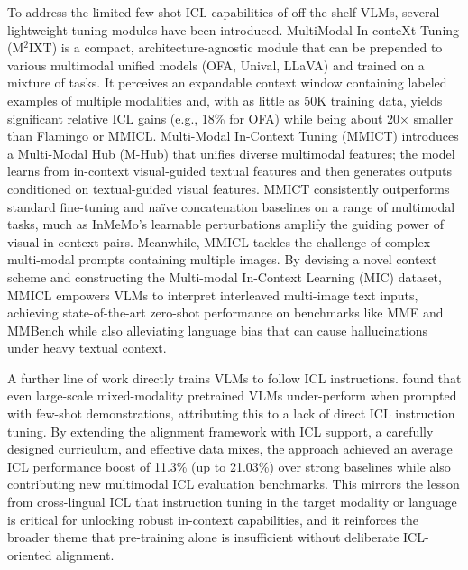 \documentclass[11pt]{article}
\begin{document}
To address the limited few-shot ICL capabilities of off-the-shelf VLMs, several lightweight tuning modules have been introduced. MultiModal In-conteXt Tuning (M\(^2\)IXT) \cite{ref107} is a compact, architecture-agnostic module that can be prepended to various multimodal unified models (OFA, Unival, LLaVA) and trained on a mixture of tasks. It perceives an expandable context window containing labeled examples of multiple modalities and, with as little as 50K training data, yields significant relative ICL gains (e.g., 18\% for OFA) while being about 20× smaller than Flamingo or MMICL. Multi-Modal In-Context Tuning (MMICT) \cite{ref108} introduces a Multi-Modal Hub (M-Hub) that unifies diverse multimodal features; the model learns from in-context visual-guided textual features and then generates outputs conditioned on textual-guided visual features. MMICT consistently outperforms standard fine-tuning and naïve concatenation baselines on a range of multimodal tasks, much as InMeMo's learnable perturbations amplify the guiding power of visual in-context pairs. Meanwhile, MMICL \cite{ref119} tackles the challenge of complex multi-modal prompts containing multiple images. By devising a novel context scheme and constructing the Multi-modal In-Context Learning (MIC) dataset, MMICL empowers VLMs to interpret interleaved multi-image text inputs, achieving state-of-the-art zero-shot performance on benchmarks like MME and MMBench while also alleviating language bias that can cause hallucinations under heavy textual context.

A further line of work directly trains VLMs to follow ICL instructions. \cite{ref120} found that even large-scale mixed-modality pretrained VLMs under-perform when prompted with few-shot demonstrations, attributing this to a lack of direct ICL instruction tuning. By extending the alignment framework with ICL support, a carefully designed curriculum, and effective data mixes, the approach achieved an average ICL performance boost of 11.3\% (up to 21.03\%) over strong baselines while also contributing new multimodal ICL evaluation benchmarks. This mirrors the lesson from cross-lingual ICL that instruction tuning in the target modality or language is critical for unlocking robust in-context capabilities, and it reinforces the broader theme that pre-training alone is insufficient without deliberate ICL-oriented alignment.
\end{document}
